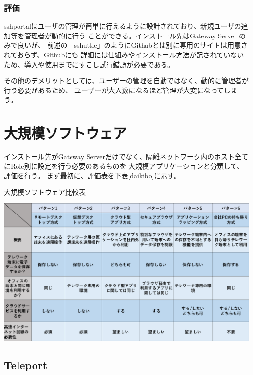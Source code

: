 \documentclass[11pt,a4j,titlepage]{jreport}
\begin{document}
\subsection*{評価}
sshportalはユーザの管理が簡単に行えるように設計されており、新規ユーザの追加等を管理者が動的に行う
ことができる。インストール先はGateway Server のみで良いが、
前述の「sshuttle」のようにGithubとは別に専用のサイトは用意されておらず、Githubにも
詳細には仕組みやインストール方法が記されていないため、導入や使用までにすこし試行錯誤が必要である。

その他のデメリットとしては、ユーザーの管理を自動ではなく、動的に管理者が行う必要があるため、
ユーザーが大人数になるほど管理が大変になってしまう。



\chapter{大規模ソフトウェア}
インストール先がGateway Serverだけでなく、隔離ネットワーク内のホスト全てにRole別に設定を行う必要のあるものを
大規模アプリケーションと分類して、評価を行う。
まず最初に、評価表を下表\ref{daikibo}に示す。

\begin{table}[tbp]
    \centering
    \caption{大規模ソフトウェア比較表}
    \includegraphics*[width=1.0\textwidth,page=5]{graphs/telework_list.pdf}
    \label{daikibo}
\end{table}

\section{Teleport}\label{teleport}
\end{document}
